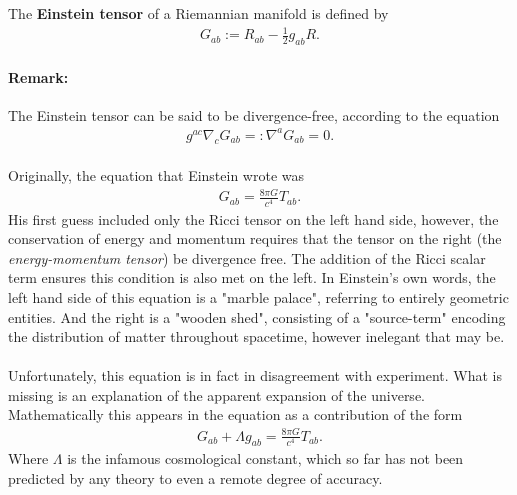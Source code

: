 \documentclass[11pt,fleqn]{report}
\begin{document}
\begin{definition}
	The \textbf{Einstein tensor} of a Riemannian manifold is defined by
		\begin{align}
			G_{ab} := R_{ab} - \tfrac{1}{2} g_{ab} R.
		\end{align}
\end{definition}

\paragraph{Remark:} The Einstein tensor can be said to be divergence-free, according to the equation
	\begin{align}
		g^{ac} \nabla_c G_{ab} =: \nabla^a G_{ab} = 0.
	\end{align}
	
\paragraph{} Originally, the equation that Einstein wrote was
	\begin{align}
		G_{ab} = \frac{8 \pi G}{c^4} T_{ab}.
	\end{align}
His first guess included only the Ricci tensor on the left hand side, however, the conservation of energy and momentum requires that the tensor on the right (the \textit{energy-momentum tensor}) be divergence free. The addition of the Ricci scalar term ensures this condition is also met on the left. In Einstein's own words, the left hand side of this equation is a "marble palace", referring to entirely geometric entities. And the right is a "wooden shed", consisting of a "source-term" encoding the distribution of matter throughout spacetime, however inelegant that may be.

\paragraph{} Unfortunately, this equation is in fact in disagreement with experiment. What is missing is an explanation of the apparent expansion of the universe. Mathematically this appears in the equation as a contribution of the form
	\begin{align}
		G_{ab} + \Lambda g_{ab} = \frac{8 \pi G}{c^4} T_{ab}.
	\end{align}
Where $\Lambda$ is the infamous cosmological constant, which so far has not been predicted by any theory to even a remote degree of accuracy.
\end{document}
